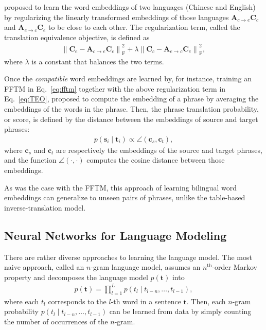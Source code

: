 \documentclass[11pt, oneside]{essay}
\newcommand{\vect}[1]{\mathbf{#1}}
\newcommand{\matr}[1]{\mathbf{#1}}
\newcommand{\vc}[0]{\vect{c}}
\newcommand{\vs}[0]{\vect{s}}
\newcommand{\vt}[0]{\vect{t}}
\newcommand{\mA}{\matr{A}}
\newcommand{\mC}{\matr{C}}
\begin{document}
\citet{Zou2013} proposed to learn the word embeddings of two
languages (Chinese and English) by regularizing the linearly
transformed embeddings of those languages $\mA_{c\to e} \mC_c$
and $\mA_{e\to c} \mC_e$ to be close to each other. The
regularization term, called the translation equivalence
objective, is defined as
\begin{align}
\label{eq:TEO}
\left\| \mC_e - \mA_{c \to e} \mC_c \right\|^2_{\text{F}} + 
\lambda \left\| \mC_c - \mA_{e \to c} \mC_e \right\|^2_{\text{F}},
\end{align}
where $\lambda$ is a constant that balances the two terms.

Once the \textit{compatible} word embeddings are learned by, for
instance, training an FFTM in Eq.~\eqref{eq:fftm} together with the
above regularization term in Eq.~\eqref{eq:TEO}, \citet{Zou2013}
proposed to compute the embedding of a phrase by averaging the
embeddings of the words in the phrase. Then, the phrase
translation probability, or score, is defined by the distance
between the embeddings of source and target phrases:
\begin{align*}
p(\vs_i \mid \vt_i) \propto \angle\left( \vc_s, \vc_t
        \right),
\end{align*}
where $\vc_s$ and $\vc_t$ are respectively the embeddings of the
source and target phrases, and the function $\angle(\cdot,\cdot)$
computes the cosine distance between those embeddings.

As was the case with the FFTM, this approach of learning
bilingual word embeddings can generalize to unseen pairs of
phrases, unlike the table-based inverse-translation model.












\subsection{Neural Networks for Language Modeling}
\label{sec:nnlm}

There are rather diverse approaches to learning the language
model. The most naive approach, called an $n$-gram language model,
assumes an $n^{\text{th}}$-order Markov property and decomposes the
language model $p(\vt)$ into
\begin{align}
    \label{eq:ngram}
    p(\vt) = \prod_{l=1}^L p(t_l \mid t_{l-n}, \dots, t_{l-1}),
\end{align}
where each $t_l$ corresponds to the $l$-th word in a sentence
$\vt$. Then, each $n$-gram probability $p(t_l \mid t_{l-n},
\dots, t_{l-1})$ can be learned from data by simply counting the
number of occurrences of the $n$-gram. 
\end{document}
